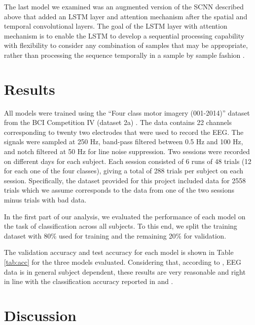 \documentclass[10pt,twocolumn,letterpaper]{article}
\begin{document}
The last model we examined was an augmented version of the SCNN described above
that added an LSTM layer and attention mechanism after the spatial and temporal
convolutional layers. The goal of the LSTM layer with attention mechanism is to
enable the LSTM to develop a sequential processing capability with flexibility
to consider any combination of samples that may be appropriate, rather than
processing the sequence temporally in a sample by sample fashion
\cite{kostas2019machine}.



\section{Results}
All models were trained using the ``Four class motor imagery (001-2014)''
dataset from the BCI Competition IV (dataset 2a) \cite{brunner2008bci}.
The data contains 22 channels corresponding to twenty two electrodes that were
used to record the EEG. The signals were sampled at 250 Hz, band-pass filtered
between 0.5 Hz and 100 Hz, and notch filtered at 50 Hz for line noise
suppression.
Two sessions were recorded on different days for each subject. Each session
consisted of 6 runs of 48 trials (12 for each one of the four classes), giving a
total of 288 trials per subject on each session. Specifically, the dataset
provided for this project included data for 2558 trials which we assume
corresponds to the data from one of the two sessions minus trials with bad data.

In the first part of our analysis, we evaluated the performance of each model on
the task of classification across all subjects. To this end, we split the
training dataset with 80\% used for training and the remaining 20\% for
validation.

The validation accuracy and test accuracy for each model is shown in Table
\ref{tab:acc} for the three models evaluated. Considering that, according to
\cite{wang},  EEG data is in general subject dependent, these results are very
reasonable and right in line with the classification accuracy reported in
\cite{kostas2019machine} and \cite{DBLP}.

\section{Discussion}
\end{document}
